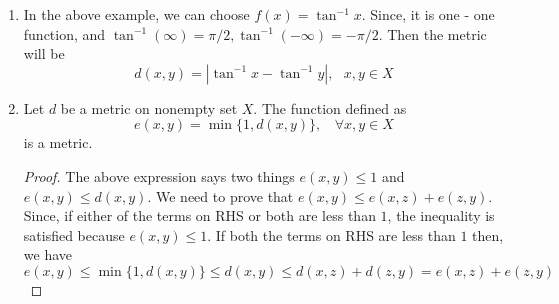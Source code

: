 \documentclass[12pt]{report}
\begin{document}
\begin{enumerate}
$$\begin{cases}
        -1 & \text{if } x = -\infty
    \end{cases}
    $$
    We define metric using $f$ as 
    $$ d(x,y) = |f(x) - f(y)|, ~~ x,y \in X$$
    \begin{proof}
        For injectivity, if $f(x) = f(y)$, we need to prove that $x = y$. Notice that $xy > 0$ is the only possible case. Since, $xy < 0$ ($x$ and $y$ are of opposite sign) is not possible because then $f(x) \neq f(y)$.
        \begin{align*}
            \frac{x}{1 + |x|} &= \frac{y}{1+|y|}\\
            x + x|y| &= y + y|x|\\
            x &= y~~~~\text{$\because$ xy $>$ 0}
        \end{align*}
        Hence, $f$ is one - one function. The metric $d$ is positive, $d(x,y) = d(y,x)$ $d = 0 \implies f(x) = f(y) \implies x = y$ ($\because f$ is one-one). On the other hand, if $x = y$ then it is obvious that $f(x) = f(y) \implies d = 0$. \\
        For triangle inequality, we can write
        \begin{align*}
            \left|\frac{x}{1+|x|} - \frac{1}{1+|y|}\right| &= \left|\frac{x}{1+|x|} - \frac{z}{1+|z|} + \frac{z}{1+|z|} - \frac{y}{1+|y|}\right| \\
            &= \left| \left(\frac{x}{1+|x|} - \frac{z}{1+|z|}\right) + \left(\frac{z}{1+|z|} - \frac{y}{1+|y|}\right)\right|\\
            &\leq \left|\frac{x}{1+|x|} - \frac{z}{1+|z|}\right| + \left|\frac{z}{1+|z|} - \frac{y}{1+|y|}\right|\\
            &\leq d(x,z) + d(z,y)
        \end{align*}
        Hence, it is a metric.
    \end{proof}
    \item In the above example, we can choose $f(x) = \tan^{-1} x$. Since, it is one - one function, and $\tan^{-1} (\infty) = \pi/2, \tan^{-1} (-\infty) = -\pi/2$. Then the metric will be
    $$ d(x, y) = |\tan^{-1} x - \tan^{-1} y|,~~~x,y \in X$$
    \item Let $d$ be a metric on nonempty set $X$. The function defined as 
    $$ e(x,y) = \min\{1, d(x,y)\},~~~~\forall x,y \in X$$ 
    is a metric.
    \begin{proof}
        The above expression says two things $e(x,y) \leq 1$ and $e(x,y) \leq d(x,y)$. We need to prove that $e(x,y) \leq e(x,z) + e(z,y)$. Since, if either of the terms on RHS or both are less than $1$, the inequality is satisfied because $e(x,y) \leq 1$. If both the terms on RHS are less than $1$ then, we have 
        $$ e(x,y) \leq \min\{1, d(x,y)\} \leq d(x,y) \leq d(x, z) + d(z,y) = e(x,z) + e(z,y)$$
    \end{proof}
\end{enumerate}
\end{document}
